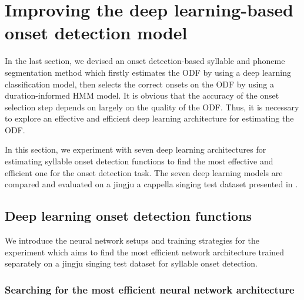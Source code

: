\section{Improving the deep learning-based onset detection model}

In the last section, we devised an onset detection-based syllable and phoneme segmentation method which firstly estimates the \gls{ODF} by using a deep learning classification model, then selects the correct onsets on the \gls{ODF} by using a duration-informed \gls{HMM} model. It is obvious that the accuracy of the onset selection step depends on largely on the quality of the \gls{ODF}. Thus, it is necessary to explore an effective and efficient deep learning architecture for estimating the \gls{ODF}.

In this section, we experiment with seven deep learning architectures for estimating syllable onset detection functions to find the most effective and efficient one for the onset detection task. The seven deep learning models are compared and evaluated on a jingju a cappella singing test dataset presented in .

\subsection{Deep learning onset detection functions}\label{sec:ch5:nn_onset_improving}

We introduce the neural network setups and training strategies for the experiment which aims to find the most efficient network architecture trained separately on a jingju singing test dataset for syllable onset detection.

\subsubsection{Searching for the most efficient neural network architecture}\label{sec:ch5:architectures_improving}

